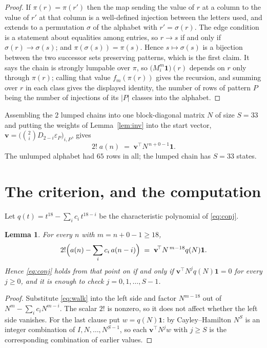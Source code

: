 \documentclass[11pt,a4paper]{article}
\theoremstyle{plain}
\newtheorem{lemma}[theorem]{Lemma}
\theoremstyle{definition}
\begin{document}
\begin{proof}
If $\pi(r)=\pi(r')$ then the map sending the value of $r$ at a column to the value of $r'$
at that column is a well-defined injection between the letters used, and extends to a
permutation $\sigma$ of the alphabet with $r'=\sigma(r)$. The edge condition is a statement
about equalities among entries, so $r\to s$ if and only if $\sigma(r)\to\sigma(s)$; and
$\pi(\sigma(s))=\pi(s)$. Hence $s\mapsto\sigma(s)$ is a bijection between the two successor
sets preserving patterns, which is the first claim. It says the chain is strongly lumpable
over $\pi$, so $\bigl(M_i^{m}\mathbf{1}\bigr)(r)$ depends on $r$ only through $\pi(r)$;
calling that value $f_m(\pi(r))$ gives the recursion, and summing over $r$ in each class
gives the displayed identity, the number of rows of pattern $P$ being the number of
injections of its $|P|$ classes into the alphabet.
\end{proof}

Assembling the $2$ lumped chains into one block-diagonal matrix $N$ of size $S=33$ and
putting the weights of Lemma~\ref{lem:inv} into the start vector,
$\mathbf{v}=\bigl(\binom{2}{i}D_{2-i}\varepsilon_P\bigr)_{i,P}$, gives
\begin{equation}\label{eq:walk}
2!\;a(n)\;=\;\mathbf{v}^{\!\top}N^{\,n+0-1}\mathbf{1} .
\end{equation}
The unlumped alphabet had $65$ rows in all; the lumped chain has $S=33$ states.

\section{The criterion, and the computation}

Let $q(t)=t^{18}-\sum_i c_i\,t^{18-i}$ be the characteristic polynomial of
\eqref{eq:conj}.

\begin{lemma}\label{lem:crit}
For every $n$ with $m=n+0-1\ge18$,
\[
2!\Bigl(a(n)-\sum_i c_i\,a(n-i)\Bigr)\;=\;\mathbf{v}^{\!\top}N^{\,m-18}q(N)\mathbf{1} .
\]
Hence \eqref{eq:conj} holds from that point on if and only if
$\mathbf{v}^{\!\top}N^{j}q(N)\mathbf{1}=0$ for every $j\ge0$, and it is enough to check
$j=0,1,\dots,S-1$.
\end{lemma}

\begin{proof}
Substitute \eqref{eq:walk} into the left side and factor $N^{m-18}$ out of
$N^{m}-\sum_i c_iN^{m-i}$. The scalar $2!$ is nonzero, so it does not affect whether
the left side vanishes. For the last clause put $w=q(N)\mathbf{1}$: by Cayley--Hamilton
$N^{S}$ is an integer combination of $I,N,\dots,N^{S-1}$, so each
$\mathbf{v}^{\!\top}N^{j}w$ with $j\ge S$ is the corresponding combination of earlier
values.
\end{proof}
\end{document}
